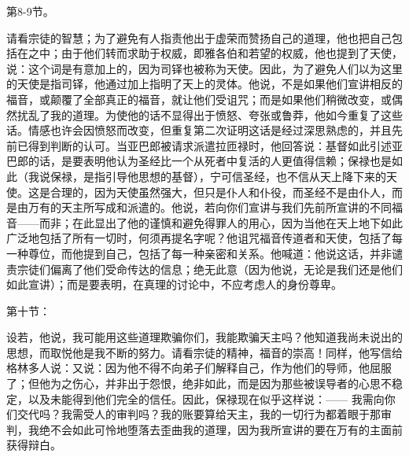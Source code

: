 第8-9节。\par

请看宗徒的智慧；为了避免有人指责他出于虚荣而赞扬自己的道理，他也把自己包括在之中；由于他们转而求助于权威，即雅各伯和若望的权威，他也提到了天使，说：这个词是有意加上的，因为司铎也被称为天使。因此，为了避免人们以为这里的天使是指司铎，他通过加上指明了天上的灵体。他说，不是如果他们宣讲相反的福音，或颠覆了全部真正的福音，就让他们受诅咒；而是如果他们稍微改变，或偶然扰乱了我的道理。为使他的话不显得出于愤怒、夸张或鲁莽，他如今重复了这些话。情感也许会因愤怒而改变，但重复第二次证明这话是经过深思熟虑的，并且先前已得到判断的认可。当亚巴郎被请求派遣拉匝禄时，他回答说：基督如此引述亚巴郎的话，是要表明他认为圣经比一个从死者中复活的人更值得信赖；保禄也是如此（我说保禄，是指引导他思想的基督），宁可信圣经，也不信从天上降下来的天使。这是合理的，因为天使虽然强大，但只是仆人和仆役，而圣经不是由仆人，而是由万有的天主所写成和派遣的。他说，若向你们宣讲与我们先前所宣讲的不同福音——而非；在此显出了他的谨慎和避免得罪人的用心，因为当他在天上地下如此广泛地包括了所有一切时，何须再提名字呢？他诅咒福音传道者和天使，包括了每一种尊位，而他提到自己，包括了每一种亲密和关系。他喊道：他说这话，并非谴责宗徒们偏离了他们受命传达的信息；绝无此意（因为他说，无论是我们还是他们如此宣讲）；而是要表明，在真理的讨论中，不应考虑人的身份尊卑。\par

第十节：\par

设若，他说，我可能用这些道理欺骗你们，我能欺骗天主吗？他知道我尚未说出的思想，而取悦他是我不断的努力。请看宗徒的精神，福音的崇高！同样，他写信给格林多人说：又说：因为他不得不向弟子们解释自己，作为他们的导师，他屈服了；但他为之伤心，并非出于怨恨，绝非如此，而是因为那些被误导者的心思不稳定，以及未能得到他们完全的信任。因此，保禄现在似乎这样说：—— 我需向你们交代吗？我需受人的审判吗？我的账要算给天主，我的一切行为都着眼于那审判，我绝不会如此可怜地堕落去歪曲我的道理，因为我所宣讲的要在万有的主面前获得辩白。\par

